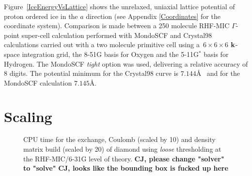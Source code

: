 \documentclass[prb,aps,nobibnotes,twocolumn,doublespace,twocolumngrid,superbib]{revtex4}
\begin{document}
Figure~\ref{IceEnergyVsLattice} shows the unrelaxed, uniaxial lattice potential of 
proton ordered ice \cite{} in the $a$ direction (see Appendix \ref{Coordinates} for the coordinate system).  
Comparison is made between a 250 molecule RHF-MIC $\Gamma$-point super-cell calculation performed 
with {\sc MondoSCF} and {\sc Crystal98} calculations carried out with a two molecule primitive
cell using a~$6\times6\times6$ $\bf k$-space integration grid, the 8-51G basis for Oxygen and the 
5-11G$^*$ basis for Hydrogen.  The {\sc MondoSCF} {\it tight} option was used, delivering 
a relative accuracy of 8 digits. The potential minimum for the {\sc Crystal98} curve is $7.144$\AA~
and  for the {\sc MondoSCF} calculation $7.145$\AA.


\section{Scaling}


\begin{figure}[h]
\caption{CPU time for the exchange, Coulomb (scaled by 10)  and density 
matrix build (scaled by 20) of diamond using {\it loose} thresholding 
at the RHF-MIC/6-31G level of theory.
{\bf CJ, please change "solver" to "solve"}
{\bf CJ, looks like the bounding box is fucked up here}
}\label{DiamondScaling}
\end{figure}
\end{document}
